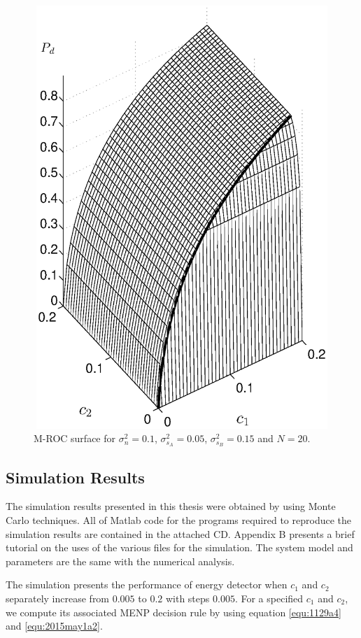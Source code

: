 \begin{figure}[!t]
\centering
\includegraphics[width=12cm, height=16cm]{4/mathc1c2pd.eps}
\caption{M-ROC surface for $\sigma_n^2 = 0.1$, $\sigma_{s_A}^2=0.05$, $\sigma_{s_B}^2=0.15$ and $N = 20$.}
\label{pic:1201a1}
\end{figure}

\subsection{Simulation Results}
The simulation results presented in this thesis were obtained by using Monte Carlo techniques. All of Matlab code for the programs required to reproduce the simulation results are contained in the attached CD. Appendix B presents a brief tutorial on the uses of the various files for the simulation. The system model and parameters are the same with the numerical analysis.  

The simulation presents the performance of energy detector when $c_1$ and $c_2$ separately increase from $0.005$ to $0.2$ with steps $0.005$. For a specified $c_1$ and $c_2$, we compute its associated MENP decision rule by using  equation \eqref{equ:1129a4} and \eqref{equ:2015may1a2}. 

